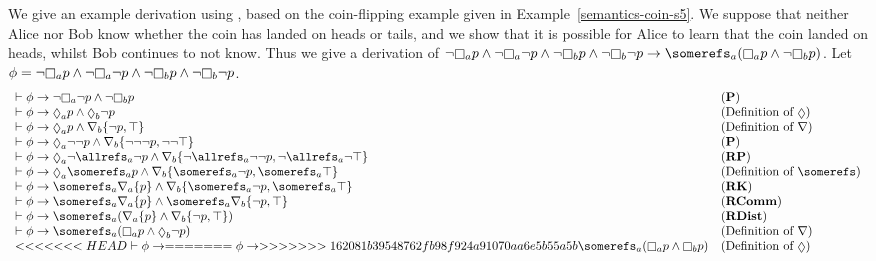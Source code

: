 \begin{example}\label{k-example}
We give an example derivation using \axiomKF{}, based on the coin-flipping
example given in Example~\ref{semantics-coin-s5}. We suppose that neither Alice
nor Bob know whether the coin has landed on heads or tails, and we show that it
is possible for Alice to learn that the coin landed on heads, whilst Bob
continues to not know. Thus we give a derivation of $\neg \knows_a p \land \neg
\knows_a \neg p \land \neg \knows_b p \land \neg \knows_b \neg p \implies
\somerefs_a (\knows_a p \land \neg \knows_b p)$. Let $\phi = \neg \knows_a p \land \neg
\knows_a \neg p \land \neg \knows_b p \land \neg \knows_b \neg p$.
$$
\begin{array}{ll}
\proves \phi \implies \neg
\knows_a \neg p \land \neg \knows_b p & \text{({\bf P})}\\
\proves \phi \implies
\suspects_a p \land \suspects_b \neg p & \text{(Definition of $\suspects$)}\\
\proves \phi \implies
\suspects_a p \land \covers_b \{\neg p, \top\} & \text{(Definition of $\covers$)}\\
\proves \phi \implies
\suspects_a \neg \neg p \land \covers_b \{\neg \neg \neg p, \neg \neg \top\} &
\text{({\bf P})}\\
\proves \phi \implies
\suspects_a \neg \allrefs_a \neg p \land \covers_b \{\neg \allrefs_a \neg \neg
p, \neg \allrefs_a \neg \top\} & \text{({\bf RP})}\\
\proves \phi \implies
\suspects_a \somerefs_a p \land \covers_b \{\somerefs_a \neg
p, \somerefs_a \top\} & \text{(Definition of $\somerefs$)}\\
\proves \phi \implies
\somerefs_a \covers_a \{p\} \land \covers_b \{\somerefs_a \neg
p, \somerefs_a \top\} & \text{({\bf RK})}\\
\proves \phi \implies
\somerefs_a \covers_a \{p\} \land \somerefs_a \covers_b \{\neg
p, \top\} & \text{({\bf RComm})}\\
\proves \phi \implies
\somerefs_a (\covers_a \{p\} \land \covers_b \{\neg
p, \top\}) & \text{({\bf RDist})}\\
\proves \phi \implies
\somerefs_a (\knows_a p \land \suspects_b \neg
p) & \text{(Definition of $\covers$)}\\
<<<<<<< HEAD
\proves \phi \implies
=======
\phi \implies
>>>>>>> 162081b39548762fb98f924a91070aa6e5b55a5b
\somerefs_a (\knows_a p \land \knows_b p) & \text{(Definition of $\suspects$)}\\
\end{array}
$$
\end{example}

